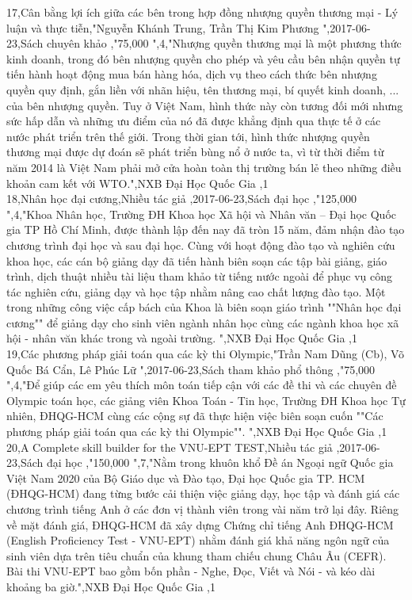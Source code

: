 \documentclass[a4paper]{article}
\begin{document}
17,Cân bằng lợi ích giữa các bên trong hợp đồng nhượng quyền thương mại - Lý luận và thực tiễn,"Nguyễn Khánh Trung, Trần Thị Kim Phương ",2017-06-23,Sách chuyên khảo ,"75,000 ",4,"Nhượng quyền thương mại là một phương thức kinh doanh, trong đó bên nhượng quyền cho phép và yêu cầu bên nhận quyền tự tiến hành hoạt động mua bán hàng hóa, dịch vụ theo cách thức bên nhượng quyền quy định, gắn liền với nhãn hiệu, tên thương mại, bí quyết kinh doanh, ... của bên nhượng quyền. Tuy ở Việt Nam, hình thức này còn tương đối mới nhưng sức hấp dẫn và những ưu điểm của nó đã được khẳng định qua thực tế ở các nước phát triển trên thế giới. Trong thời gian tới, hình thức nhượng quyền thương mại được dự đoán sẽ phát triển bùng nổ ở nước ta, vì từ thời điểm từ năm 2014 là Việt Nam phải mở cửa hoàn toàn thị trường bán lẻ theo những điều khoản cam kết với WTO.",NXB Đại Học Quốc Gia ,1\\
18,Nhân học đại cương,Nhiều tác giả ,2017-06-23,Sách đại học ,"125,000 ",4,"Khoa Nhân học, Trường ĐH Khoa học Xã hội và Nhân văn – Đại học Quốc gia TP Hồ Chí Minh, được thành lập đến nay đã tròn 15 năm, đảm nhận đào tạo chương trình đại học và sau đại học. Cùng với hoạt động đào tạo và nghiên cứu khoa học, các cán bộ giảng dạy đã tiến hành biên soạn các tập bài giảng, giáo trình, dịch thuật nhiều tài liệu tham khảo từ tiếng nước ngoài để phục vụ công tác nghiên cứu, giảng dạy và học tập nhằm nâng cao chất lượng đào tạo. Một trong những công việc cấp bách của Khoa là biên soạn giáo trình ""Nhân học đại cương"" để giảng dạy cho sinh viên ngành nhân học cùng các ngành khoa học xã hội - nhân văn khác trong và ngoài trường. ",NXB Đại Học Quốc Gia ,1\\
19,Các phương pháp giải toán qua các kỳ thi Olympic,"Trần Nam Dũng (Cb), Võ Quốc Bá Cẩn, Lê Phúc Lữ ",2017-06-23,Sách tham khảo phổ thông ,"75,000 ",4,"Để giúp các em yêu thích môn toán tiếp cận với các đề thi và các chuyên đề Olympic toán học, các giảng viên Khoa Toán - Tin học, Trường ĐH Khoa học Tự nhiên, ĐHQG-HCM cùng các cộng sự đã thực hiện việc biên soạn cuốn ""Các phương pháp giải toán qua các kỳ thi Olympic"". ",NXB Đại Học Quốc Gia ,1\\
20,A Complete skill builder for the VNU-EPT TEST,Nhiều tác giả ,2017-06-23,Sách đại học ,"150,000 ",7,"Nằm trong khuôn khổ Đề án Ngoại ngữ Quốc gia Việt Nam 2020 của Bộ Giáo dục và Đào tạo, Đại học Quốc gia TP. HCM (ĐHQG-HCM) đang từng bước cải thiện việc giảng dạy, học tập và đánh giá các chương trình tiếng Anh ở các đơn vị thành viên trong vài năm trở lại đây. Riêng về mặt đánh giá, ĐHQG-HCM đã xây dựng Chứng chỉ tiếng Anh ĐHQG-HCM (English Proficiency Test - VNU-EPT) nhằm đánh giá khả năng ngôn ngữ của sinh viên dựa trên tiêu chuẩn của khung tham chiếu chung Châu Âu (CEFR). Bài thi VNU-EPT bao gồm bốn phần - Nghe, Đọc, Viết và Nói - và kéo dài khoảng ba giờ.",NXB Đại Học Quốc Gia ,1\\
\end{document}
